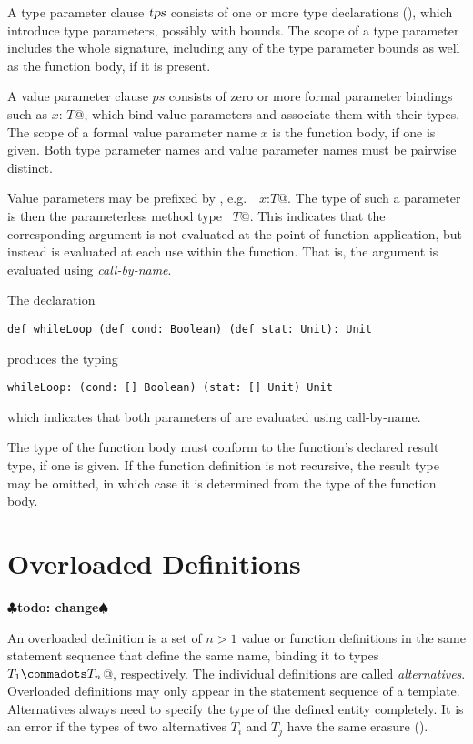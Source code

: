 \documentclass[a4paper,12pt,twoside,titlepage]{book}
\newcommand{\tps}{\mbox{\sl tps}}
\renewcommand{\todo}[1]{{$\clubsuit$\bf todo: #1$\spadesuit$}}
\begin{document}
A type parameter clause $\tps$ consists of one or more type
declarations (), which introduce type parameters,
possibly with bounds.  The scope of a type parameter includes
the whole signature, including any of the type parameter bounds as
well as the function body, if it is present.  

A value parameter clause $ps$ consists of zero or more formal
parameter bindings such as \lstinline@$x$: $T$@, which bind value
parameters and associate them with their types.  The scope of a formal
value parameter name $x$ is the function body, if one is
given. Both type parameter names and value parameter names must be
pairwise distinct.

Value parameters may be prefixed by , e.g.\
~\lstinline@def $x$:$T$@. The type of such a parameter is then the
parameterless method type ~\lstinline@[]$T$@. This indicates that the
corresponding argument is not evaluated at the point of function
application, but instead is evaluated at each use within the
function. That is, the argument is evaluated using {\em call-by-name}.

\example The declaration
\begin{lstlisting}
def whileLoop (def cond: Boolean) (def stat: Unit): Unit
\end{lstlisting}
produces the typing
\begin{lstlisting}
whileLoop: (cond: [] Boolean) (stat: [] Unit) Unit
\end{lstlisting}
which indicates that both parameters of  are evaluated using
call-by-name.

The type of the function body must conform to the function's declared
result type, if one is given. If the function definition is not
recursive, the result type may be omitted, in which case it is
determined from the type of the function body.

\section{Overloaded Definitions}
\label{sec:overloaded-defs}
\todo{change}

An overloaded definition is a set of $n > 1$ value or function
definitions in the same statement sequence that define the same name,
binding it to types ~\lstinline@$T_1 \commadots T_n$@, respectively.
The individual definitions are called {\em alternatives}.  Overloaded
definitions may only appear in the statement sequence of a template.
Alternatives always need to specify the type of the defined entity
completely.  It is an error if the types of two alternatives $T_i$ and
$T_j$ have the same erasure (\sref{sec:erasure}).
\end{document}
